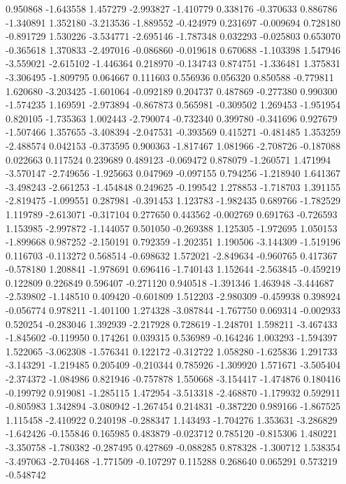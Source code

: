 0.950868
-1.643558
1.457279
-2.993827
-1.410779
0.338176
-0.370633
0.886786
-1.340891
1.352180
-3.213536
-1.889552
-0.424979
0.231697
-0.009694
0.728180
-0.891729
1.530226
-3.534771
-2.695146
-1.787348
0.032293
-0.025803
0.653070
-0.365618
1.370833
-2.497016
-0.086860
-0.019618
0.670688
-1.103398
1.547946
-3.559021
-2.615102
-1.446364
0.218970
-0.134743
0.874751
-1.336481
1.375831
-3.306495
-1.809795
0.064667
0.111603
0.556936
0.056320
0.850588
-0.779811
1.620680
-3.203425
-1.601064
-0.092189
0.204737
0.487869
-0.277380
0.990300
-1.574235
1.169591
-2.973894
-0.867873
0.565981
-0.309502
1.269453
-1.951954
0.820105
-1.735363
1.002443
-2.790074
-0.732340
0.399780
-0.341696
0.927679
-1.507466
1.357655
-3.408394
-2.047531
-0.393569
0.415271
-0.481485
1.353259
-2.488574
0.042153
-0.373595
0.900363
-1.817467
1.081966
-2.708726
-0.187088
0.022663
0.117524
0.239689
0.489123
-0.069472
0.878079
-1.260571
1.471994
-3.570147
-2.749656
-1.925663
0.047969
-0.097155
0.794256
-1.218940
1.641367
-3.498243
-2.661253
-1.454848
0.249625
-0.199542
1.278853
-1.718703
1.391155
-2.819475
-1.099551
0.287981
-0.391453
1.123783
-1.982435
0.689766
-1.782529
1.119789
-2.613071
-0.317104
0.277650
0.443562
-0.002769
0.691763
-0.726593
1.153985
-2.997872
-1.144057
0.501050
-0.269388
1.125305
-1.972695
1.050153
-1.899668
0.987252
-2.150191
0.792359
-1.202351
1.190506
-3.144309
-1.519196
0.116703
-0.113272
0.568514
-0.698632
1.572021
-2.849634
-0.960765
0.417367
-0.578180
1.208841
-1.978691
0.696416
-1.740143
1.152644
-2.563845
-0.459219
0.122809
0.226849
0.596407
-0.271120
0.940518
-1.391346
1.463948
-3.444687
-2.539802
-1.148510
0.409420
-0.601809
1.512203
-2.980309
-0.459938
0.398924
-0.056774
0.978211
-1.401100
1.274328
-3.087844
-1.767750
0.069314
-0.002933
0.520254
-0.283046
1.392939
-2.217928
0.728619
-1.248701
1.598211
-3.467433
-1.845602
-0.119950
0.174261
0.039315
0.536989
-0.164246
1.003293
-1.594397
1.522065
-3.062308
-1.576341
0.122172
-0.312722
1.058280
-1.625836
1.291733
-3.143291
-1.219485
0.205409
-0.210344
0.785926
-1.309920
1.571671
-3.505404
-2.374372
-1.084986
0.821946
-0.757878
1.550668
-3.154417
-1.474876
0.180416
-0.199792
0.919081
-1.285115
1.472954
-3.513318
-2.468870
-1.179932
0.592911
-0.805983
1.342894
-3.080942
-1.267454
0.214831
-0.387220
0.989166
-1.867525
1.115458
-2.410922
0.240198
-0.288347
1.143493
-1.704276
1.353631
-3.286829
-1.642426
-0.155846
0.165985
0.483879
-0.023712
0.785120
-0.815306
1.480221
-3.350758
-1.780382
-0.287495
0.427869
-0.088285
0.878328
-1.300712
1.538354
-3.497063
-2.704468
-1.771509
-0.107297
0.115288
0.268640
0.065291
0.573219
-0.548742
